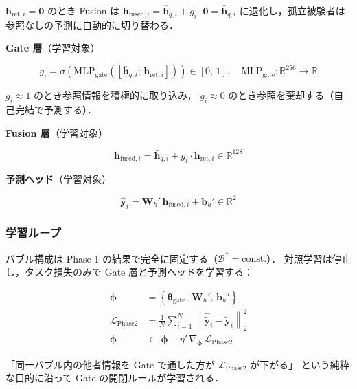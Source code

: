 \documentclass[12pt, a4paper]{ltjsarticle}
\begin{document}
\noindent
$\bm{h}_{\text{ret},i} = \bm{0}$ のとき Fusion は
$\bm{h}_{\text{fused},i} = \bar{\bm{h}}_{q,i} + g_i \cdot \bm{0} = \bar{\bm{h}}_{q,i}$
に退化し，孤立被験者は参照なしの予測に自動的に切り替わる．

\noindent\textbf{Gate 層}（学習対象）

\begin{equation}
  g_i
  = \sigma\!\left(
      \mathrm{MLP}_{\text{gate}}\!\left(
        \left[\bar{\bm{h}}_{q,i};\,\bm{h}_{\text{ret},i}\right]
      \right)
    \right) \in [0,\,1],
  \quad
  \mathrm{MLP}_{\text{gate}} : \mathbb{R}^{256} \to \mathbb{R}
\end{equation}

\noindent
$g_i \approx 1$ のとき参照情報を積極的に取り込み，
$g_i \approx 0$ のとき参照を棄却する（自己完結で予測する）．

\noindent\textbf{Fusion 層}（学習対象）

\begin{equation}
  \bm{h}_{\text{fused},i}
  = \bar{\bm{h}}_{q,i} + g_i \cdot \bm{h}_{\text{ret},i}
  \in \mathbb{R}^{128}
\end{equation}

\noindent\textbf{予測ヘッド}（学習対象）

\begin{equation}
  \hat{\bm{y}}_i
  = \bm{W}_h'\,\bm{h}_{\text{fused},i} + \bm{b}_h'
  \in \mathbb{R}^2
\end{equation}

\subsubsection*{学習ループ}

バブル構成は Phase 1 の結果で完全に固定する（$\mathcal{B}^* = \mathrm{const.}$）．
対照学習は停止し，タスク損失のみで Gate 層と予測ヘッドを学習する：

\begin{align}
  \bm{\phi} &= \left\{\bm{\theta}_{\text{gate}},\,\bm{W}_h',\,\bm{b}_h'\right\}
  \\
  \mathcal{L}_{\text{Phase2}}
  &= \frac{1}{N} \sum_{i=1}^{N}
    \left\|\hat{\tilde{\bm{y}}}_i - \tilde{\bm{y}}_i\right\|_2^2
  \\
  \bm{\phi}
  &\leftarrow \bm{\phi} - \eta'\,\nabla_{\bm{\phi}}\,\mathcal{L}_{\text{Phase2}}
\end{align}

\noindent
「同一バブル内の他者情報を Gate で通した方が $\mathcal{L}_{\text{Phase2}}$ が下がる」
という純粋な目的に沿って Gate の開閉ルールが学習される．
\end{document}
